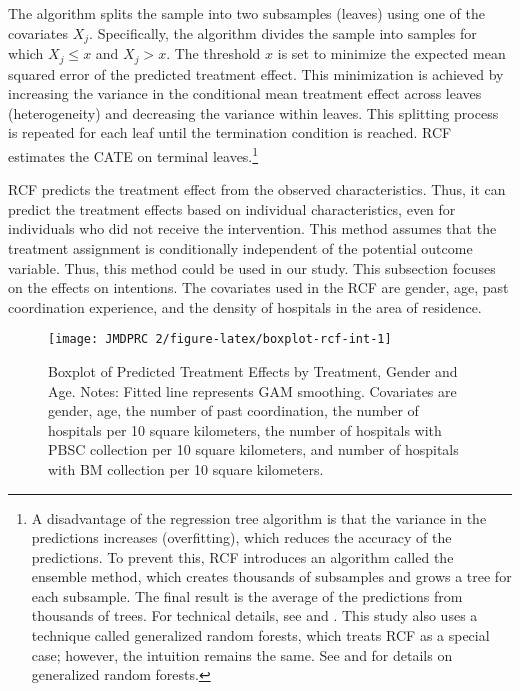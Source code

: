 \documentclass[12pt, a4paper]{article}
\begin{document}
The algorithm splits the sample into two subsamples (leaves) using one of the covariates \(X_j\). Specifically, the algorithm divides the sample into samples for which \(X_j \le x\) and \(X_j > x\). The threshold \(x\) is set to minimize the expected mean squared error of the predicted treatment effect. This minimization is achieved by increasing the variance in the conditional mean treatment effect across leaves (heterogeneity) and decreasing the variance within leaves. This splitting process is repeated for each leaf until the termination condition is reached. RCF estimates the CATE on terminal leaves.\footnote{A disadvantage of the regression tree algorithm is that the variance in the predictions increases (overfitting), which reduces the accuracy of the predictions. To prevent this, RCF introduces an algorithm called the ensemble method, which creates thousands of subsamples and grows a tree for each subsample. The final result is the average of the predictions from thousands of trees. For technical details, see \citet{Athey2016} and \citet{Wager2018}. This study also uses a technique called generalized random forests, which treats RCF as a special case; however, the intuition remains the same. See \citet{Athey2019} and \citet{Athey2019a} for details on generalized random forests.}

RCF predicts the treatment effect from the observed characteristics. Thus, it can predict the treatment effects based on individual characteristics, even for individuals who did not receive the intervention. This method assumes that the treatment assignment is conditionally independent of the potential outcome variable. Thus, this method could be used in our study. This subsection focuses on the effects on intentions. The covariates used in the RCF are gender, age, past coordination experience, and the density of hospitals in the area of residence.

\begin{figure}[t]
\texttt{[image: JMDPRC~2/figure-latex/boxplot-rcf-int-1]} \caption{Boxplot of Predicted Treatment Effects by Treatment, Gender and Age. Notes: Fitted line represents GAM smoothing. Covariates are gender, age, the number of past coordination, the number of hospitals per 10 square kilometers, the number of hospitals with PBSC collection per 10 square kilometers, and number of hospitals with BM collection per 10 square kilometers.}\label{fig:boxplot-rcf-int}
\end{figure}
\end{document}
